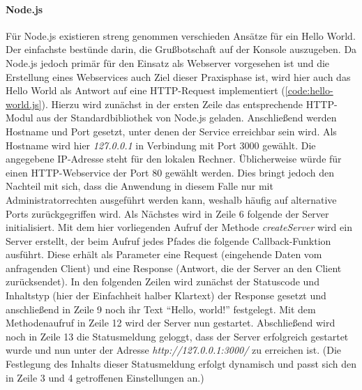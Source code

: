 \paragraph{Node.js}
Für Node.js existieren streng genommen verschieden Ansätze für ein Hello World.
Der einfachste bestünde darin, die Grußbotschaft auf der Konsole auszugeben.
Da Node.js jedoch primär für den Einsatz als Webserver vorgesehen ist und die Erstellung eines Webservices auch Ziel dieser Praxisphase ist, wird hier auch das Hello World als Antwort auf eine \ac{HTTP}-Request implementiert (\autoref{code:hello-world.js}).
Hierzu wird zunächst in der ersten Zeile das entsprechende \ac{HTTP}-Modul aus der Standardbibliothek von Node.js geladen.
Anschließend werden Hostname und Port gesetzt, unter denen der Service erreichbar sein wird.
Als Hostname wird hier \emph{127.0.0.1} in Verbindung mit Port 3000 gewählt.
Die angegebene \ac{IP}-Adresse steht für den lokalen Rechner.
Üblicherweise würde für einen \ac{HTTP}-Webservice der Port 80 gewählt werden.
Dies bringt jedoch den Nachteil mit sich, dass die Anwendung in diesem Falle nur mit Administratorrechten ausgeführt werden kann, weshalb häufig auf alternative Ports zurückgegriffen wird.
Als Nächstes wird in Zeile 6 folgende der Server initialisiert.
Mit dem hier vorliegenden Aufruf der Methode \emph{createServer} wird ein Server erstellt, der beim Aufruf jedes Pfades die folgende Callback-Funktion ausführt.
Diese erhält als Parameter eine Request (eingehende Daten vom anfragenden Client) und eine Response (Antwort, die der Server an den Client zurücksendet).
In den folgenden Zeilen wird zunächst der Statuscode und Inhaltstyp (hier der Einfachheit halber Klartext) der Response gesetzt und anschließend in Zeile 9 noch ihr Text \enquote{Hello, world!} festgelegt.
Mit dem Methodenaufruf in Zeile 12 wird der Server nun gestartet.
Abschließend wird noch in Zeile 13 die Statusmeldung geloggt, dass der Server erfolgreich gestartet wurde und nun unter der Adresse \emph{http://127.0.0.1:3000/} zu erreichen ist.
(Die Festlegung des Inhalts dieser Statusmeldung erfolgt dynamisch und passt sich den in Zeile 3 und 4 getroffenen Einstellungen an.)



